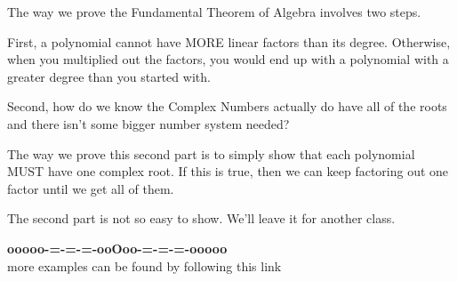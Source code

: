 \documentclass{ximera}
\begin{document}
\begin{idea}


The way we prove the Fundamental Theorem of Algebra involves two steps. 


First, a polynomial cannot have MORE linear factors than its degree. Otherwise, when you multiplied out the factors, you would end up with a polynomial with a greater degree than you started with.


Second, how do we know the Complex Numbers actually do have all of the roots and there isn't some bigger number system needed? 

The way we prove this second part is to simply show that each polynomial MUST have one complex root. If this is true, then we can keep factoring out one factor until we get all of them.

The second part is not so easy to show.  We'll leave it for another class.


\end{idea}




















\begin{center}
\textbf{\textcolor{green!50!black}{ooooo-=-=-=-ooOoo-=-=-=-ooooo}} \\

more examples can be found by following this link\\ 

\end{center}
\end{document}
